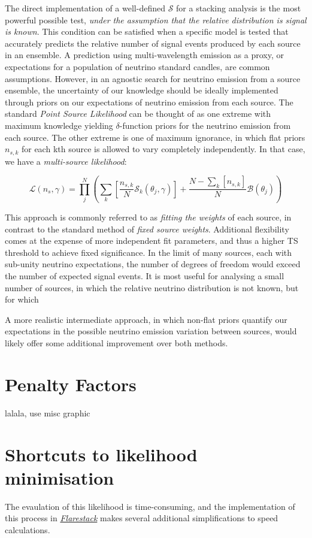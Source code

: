 The direct implementation of a well-defined $\mathcal{S}$ for a stacking analysis is the most powerful possible test, \emph{under the assumption that the relative distribution is signal is known}. This condition can be satisfied when a specific model is tested that accurately predicts the relative number of signal events produced by each source in an ensemble. A prediction using multi-wavelength emission as a proxy, or expectations for a population of neutrino standard candles, are common assumptions. However, in an agnostic search for neutrino emission from a source ensemble, the uncertainty of our knowledge should be ideally implemented through priors on our expectations of neutrino emission from each source. The standard \emph{Point Source Likelihood} can be thought of as one extreme with maximum knowledge yielding $\delta$-function priors for the neutrino emission from each source. The other extreme is one of maximum ignorance, in which flat priors $n_{s, k}$ for each kth source is allowed to vary completely independently. In that case, we have a \emph{multi-source likelihood}:

\[ \mathcal{L}(n_{s}, \gamma) = \prod_{j}^{N} \left(\sum_{k} \left[ \frac{n_{s, k}}{N} \mathcal{S}_{k}(\theta_{j}, \gamma) \right]+ \frac{N - \sum_{k} \left[ n_{s, k} \right] }{N} \mathcal{B}(\theta_{j})  \right)\]

This approach is commonly referred to as \emph{fitting the weights} of each source, in contrast to the standard method of \emph{fixed source weights}. Additional flexibility comes at the expense of more independent fit parameters, and thus a higher TS threshold to achieve fixed significance. In the limit of many sources, each with sub-unity neutrino expectations, the number of degrees of freedom would exceed the number of expected signal events. It is most useful for analysing a small number of sources, in which the relative neutrino distribution is not known, but for which 

A more realistic intermediate approach, in which non-flat priors quantify our expectations in the possible neutrino emission variation between sources, would likely offer some additional improvement over both methods. 

\section{Penalty Factors}
lalala, use misc graphic

\section{Shortcuts to likelihood minimisation}
The evaulation of this likelihood is time-consuming, and the implementation of this process in \emph{\href{https://github.com/IceCubeOpenSource/flarestack}{Flarestack}} makes several additional simplifications to speed calculations. 

